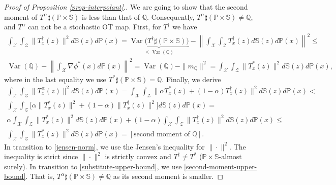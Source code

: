 \documentclass{article} %
\DeclareMathOperator{\Var}{Var}
\begin{document}
\begin{proof}[Proof of Proposition \ref{prop-interpolant}.]

We are going to show that the second moment of $T^{\alpha}\sharp(\mathbb{P}\!\times\!\mathbb{S})$ is less than that of $\mathbb{Q}$. Consequently, $T^{\alpha}\sharp(\mathbb{P}\!\times\!\mathbb{S})\neq\mathbb{Q}$, and $T^{\alpha}$ can not be a stochastic OT map. First, for $T^{\dagger}$ we have
\begin{eqnarray}
    \int_{\mathcal{X}}\int_{\mathcal{Z}}\|T_{x}^{\dagger}(z)\|^{2}d\mathbb{S}(z)d\mathbb{P}(x)=\underbrace{\Var\big(T^{\dagger}\sharp(\mathbb{P}\times\mathbb{S})\big)}_{\leq\Var(\mathbb{Q})}-\left\|\int_{\mathcal{X}}\int_{\mathcal{Z}}T_{x}^{\dagger}(z)d\mathbb{S}(z)d\mathbb{P}(x)\right\|^{2}\leq
    \nonumber
    \\
    \Var(\mathbb{Q})-\left\|\int_{\mathcal{X}}\nabla\phi^{*}(x)d\mathbb{P}(x)\right\|^{2}=\Var(\mathbb{Q})-\|m_{\mathbb{Q}}\|^{2}=\int_{\mathcal{X}}\int_{\mathcal{Z}}\|T^{*}_{x}(z)\|^{2}d\mathbb{S}(z)d\mathbb{P}(x), 
    \label{second-moment-upper-bound}
\end{eqnarray}
where in the last equality we use $T^{*}\sharp(\mathbb{P}\times\mathbb{S})=\mathbb{Q}$. Finally, we derive
\begin{eqnarray}
    \int_{\mathcal{X}}\int_{\mathcal{Z}}\|T^{\alpha}_{x}(z)\|^{2}d\mathbb{S}(z)d\mathbb{P}(x)=\int_{\mathcal{X}}\int_{\mathcal{Z}}\|\alpha T^{*}_{x}(z)+(1-\alpha)T_{x}^{\dagger}(z)\|^{2}d\mathbb{S}(z)d\mathbb{P}(x)<
    \nonumber
    \\
    \int_{\mathcal{X}}\int_{\mathcal{Z}}\big[\alpha\| T^{*}_{x}(z)\|^{2}+(1-\alpha)\| T_{x}^{\dagger}(z)\|^{2}\big]d\mathbb{S}(z)d\mathbb{P}(x)=
    \label{jensen-norm}
    \\
    \alpha\int_{\mathcal{X}}\int_{\mathcal{Z}}\| T^{*}_{x}(z)\|^{2}d\mathbb{S}(z)d\mathbb{P}(x)+(1-\alpha)\int_{\mathcal{X}}\int_{\mathcal{Z}}\| T_{x}^{\dagger}(z)\|^{2}d\mathbb{S}(z)d\mathbb{P}(x)\leq
    \nonumber
    \\
    \int_{\mathcal{X}}\int_{\mathcal{Z}}\| T^{*}_{x}(z)\|^{2}d\mathbb{S}(z)d\mathbb{P}(x)=[\mbox{second moment of }\mathbb{Q}].
    \label{substitute-upper-bound}
\end{eqnarray}
In transition to \eqref{jensen-norm}, we use the Jensen's inequality for $\|\cdot\|^{2}$. The inequality is strict since $\|\cdot\|^{2}$ is strictly convex and $T^{\dagger}\neq T^{*}$ ($\mathbb{P}\times\mathbb{S}$-almost surely). In transition to \eqref{substitute-upper-bound}, we use \eqref{second-moment-upper-bound}. That is, $T^{\alpha}\sharp(\mathbb{P}\times\mathbb{S})\neq\mathbb{Q}$ as its second moment is smaller.
\end{proof}
\end{document}
